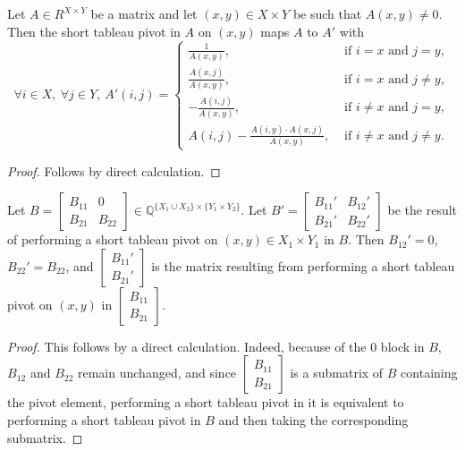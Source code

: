 \begin{lemma}
    \label{Matrix.shortTableauPivot_eq}
    \leanok
    Let $A \in R^{X \times Y}$ be a matrix and let $(x, y) \in X \times Y$ be such that $A (x, y) \neq 0$. Then the short tableau pivot in $A$ on $(x, y)$ maps $A$ to $A'$ with
    \[
        \forall i \in X, \ \forall j \in Y, \ A' (i, j) = \begin{cases}
            \frac{1}{A (x, y)}, & \text{ if } i = x \text{ and } j = y, \\
            \frac{A (x, j)}{A (x, y)}, & \text{ if } i = x \text{ and } j \neq y, \\
            -\frac{A (i, j)}{A (x, y)}, & \text{ if } i \neq x \text{ and } j = y, \\
            A (i, j) - \frac{A (i, y) \cdot A (x, j)}{A (x, y)}, & \text{ if } i \neq x \text{ and } j \neq y.
        \end{cases}
    \]
\end{lemma}

\begin{proof}
    \leanok
    Follows by direct calculation.
\end{proof}

\begin{lemma}
    \label{Matrix.shortTableauPivot_zero}
    \leanok
    Let $B = \begin{bmatrix} B_{11} & 0 \\ B_{21} & B_{22} \end{bmatrix} \in \mathbb{Q}^{\{X_{1} \cup X_{2}\} \times \{Y_{1} \times Y_{2}\}}$. Let $B' = \begin{bmatrix} B_{11}' & B_{12}' \\ B_{21}' & B_{22}' \end{bmatrix}$ be the result of performing a short tableau pivot on $(x, y) \in X_{1} \times Y_{1}$ in $B$. Then $B_{12}' = 0$, $B_{22}' = B_{22}$, and $\begin{bmatrix} B_{11}' \\ B_{21}' \end{bmatrix}$ is the matrix resulting from performing a short tableau pivot on $(x, y)$ in $\begin{bmatrix} B_{11} \\ B_{21} \end{bmatrix}$.
\end{lemma}

\begin{proof}
    \leanok
    This follows by a direct calculation. Indeed, because of the $0$ block in $B$, $B_{12}$ and $B_{22}$ remain unchanged, and since $\begin{bmatrix} B_{11} \\ B_{21} \end{bmatrix}$ is a submatrix of $B$ containing the pivot element, performing a short tableau pivot in it is equivalent to performing a short tableau pivot in $B$ and then taking the corresponding submatrix.
\end{proof}

